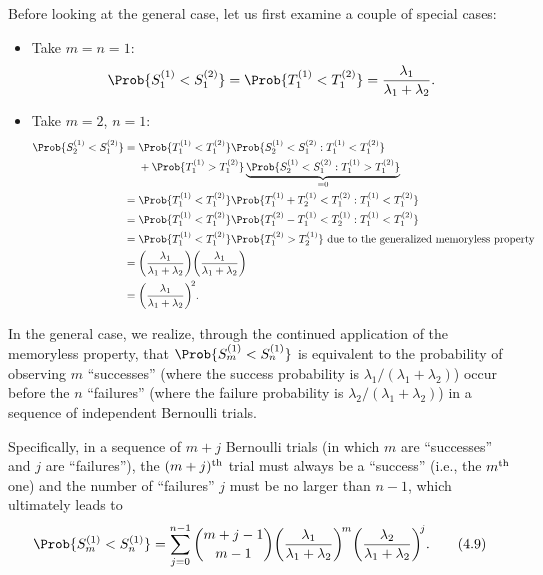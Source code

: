 \begin{Regular}
    Before looking at the general case, let us first examine a couple of special cases:
    \begin{itemize}
        \item Take $ m=n=1 $:
              \[ \Prob{S_1^{(1)}<S_1^{(2)}}=\Prob{T_1^{(1)}<T_1^{(2)}}=\frac{\lambda_1}{\lambda_1+\lambda_2}. \]
        \item Take $ m=2 $, $ n=1 $:
              \begin{align*}
                  \Prob{S_2^{(1)}<S_1^{(2)}}
                   & =\Prob{T_1^{(1)}<T_1^{(2)}}\Prob{S_2^{(1)}<S_1^{(2)}\given T_1^{(1)}<T_1^{(2)}}                                   \\
                   & \phantom{{}={}}+ \Prob{T_1^{(1)}>T_1^{(2)}}\underbrace{\Prob{S_2^{(1)}<S_1^{(2)}\given T_1^{(1)}>T_1^{(2)}}}_{=0} \\
                   & =\Prob{T_1^{(1)}<T_1^{(2)}}\Prob{T_1^{(1)}+T_2^{(1)}<T_1^{(2)}\given T_1^{(1)}<T_1^{(2)}}                         \\
                   & =\Prob{T_1^{(1)}<T_1^{(2)}}\Prob{T_1^{(2)}-T_1^{(1)}<T_2^{(1)}\given T_1^{(1)}<T_1^{(2)}}                         \\
                   & =\Prob{T_1^{(1)}<T_1^{(2)}}\Prob{T_1^{(2)}>T_2^{(1)}}\text{ due to the generalized memoryless property}           \\
                   & =\biggl(\frac{\lambda_1}{\lambda_1+\lambda_2}\biggr)\biggl(\frac{\lambda_1}{\lambda_1+\lambda_2}\biggr)           \\
                   & =\biggl(\frac{\lambda_1}{\lambda_1+\lambda_2}\biggr)^{\!2}.
              \end{align*}
    \end{itemize}
    In the general case, we realize, through the continued application of the memoryless property,
    that $ \Prob{S_m^{(1)}<S_n^{(1)}} $ is equivalent to the probability of observing $ m $ ``successes''
    (where the success probability is $ \lambda_1/(\lambda_1+\lambda_2) $) occur before the $ n $ ``failures''
    (where the failure probability is $ \lambda_2/(\lambda_1+\lambda_2) $) in a sequence of independent Bernoulli trials.

    \vspace{2mm}

    Specifically, in a sequence of $ m+j $ Bernoulli trials (in which $ m $ are ``successes'' and $ j $
    are ``failures''), the $ (m+j)\textsuperscript{th} $ trial must always be a ``success'' (i.e., the $ m\textsuperscript{th} $ one)
    and the number of ``failures'' $ j $ must be no larger than $ n-1 $, which ultimately leads to
    \[ \Prob{S_m^{(1)}<S_n^{(1)}}=\sum_{j=0}^{n-1}\binom{m+j-1}{m-1}\biggl(\frac{\lambda_1}{\lambda_1+\lambda_2}\biggr)^{\!m}\biggl(\frac{\lambda_2}{\lambda_1+\lambda_2}\biggr)^{\!j}.
        \label{eq4.9}\tag*{(4.9)} \]
\end{Regular}
